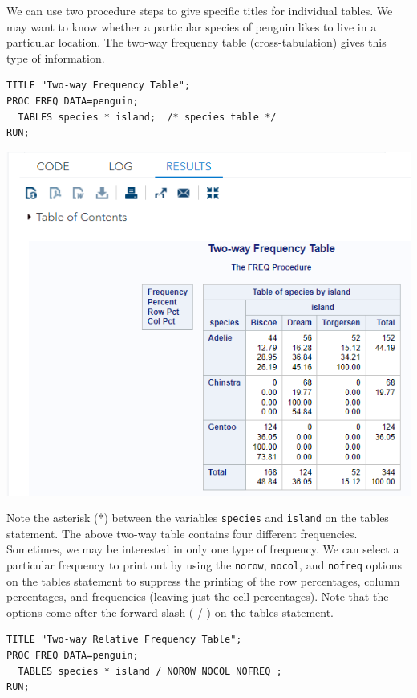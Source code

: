 \documentclass[
]{book}
\begin{document}
We can use two procedure steps to give specific titles for individual tables. We may want to know whether a particular species of penguin likes to live in a particular location. The two-way frequency table (cross-tabulation) gives this type of information.

\begin{verbatim}
TITLE "Two-way Frequency Table";
PROC FREQ DATA=penguin;
  TABLES species * island;  /* species table */
RUN;
\end{verbatim}

\begin{center}\includegraphics[width=1\linewidth]{img05/w05-2wayFreqTable} \end{center}

Note the asterisk (*) between the variables \texttt{species} and \texttt{island} on the tables statement. The above two-way table contains four different frequencies. Sometimes, we may be interested in only one type of frequency. We can select a particular frequency to print out by using the \texttt{norow}, \texttt{nocol}, and \texttt{nofreq} options on the tables statement to suppress the printing of the row percentages, column percentages, and frequencies (leaving just the cell percentages). Note that the options come after the forward-slash ( / ) on the tables statement.

\begin{verbatim}
TITLE "Two-way Relative Frequency Table";
PROC FREQ DATA=penguin;
  TABLES species * island / NOROW NOCOL NOFREQ ;
RUN;
\end{verbatim}
\end{document}
